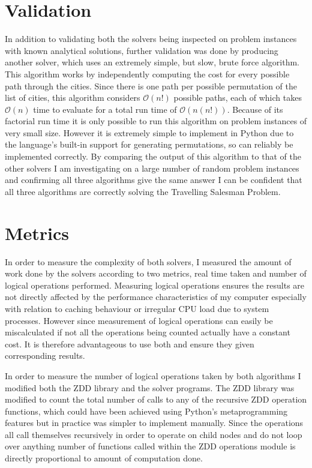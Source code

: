 \documentclass[12pt,a4paper,twoside,openright]{report}
\begin{document}
\section{Validation}
In addition to validating both the solvers being inspected on problem instances with known analytical solutions, further validation was done by producing another solver, which uses an extremely simple, but slow, brute force algorithm. This algorithm works by independently computing the cost for every possible path through the cities. Since there is one path per possible permutation of the list of cities, this algorithm considers $\mathcal{O}(n!)$ possible paths, each of which takes $\mathcal{O}(n)$ time to evaluate for a total run time of $\mathcal{O}(n(n!))$. Because of its factorial run time it is only possible to run this algorithm on problem instances of very small size. However it is extremely simple to implement in Python due to the language's built-in support for generating permutations, so can reliably be implemented correctly. By comparing the output of this algorithm to that of the other solvers I am investigating on a large number of random problem instances and confirming all three algorithms give the same answer I can be confident that all three algorithms are correctly solving the Travelling Salesman Problem.

\section{Metrics}
In order to measure the complexity of both solvers, I measured the amount of work done by the solvers according to two metrics, real time taken and number of logical operations performed. Measuring logical operations ensures the results are not directly affected by the performance characteristics of my computer especially with relation to caching behaviour or irregular CPU load due to system processes. However since measurement of logical operations can easily be miscalculated if not all the operations being counted actually have a constant cost. It is therefore advantageous to use both and ensure they given corresponding results.

In order to measure the number of logical operations taken by both algorithms I modified both the ZDD library and the solver programs. The ZDD library was modified to count the total number of calls to any of the recursive ZDD operation functions, which could have been achieved using Python's metaprogramming features but in practice was simpler to implement manually. Since the operations all call themselves recursively in order to operate on child nodes and do not loop over anything number of functions called within the ZDD operations module is directly proportional to amount of computation done.
\end{document}
